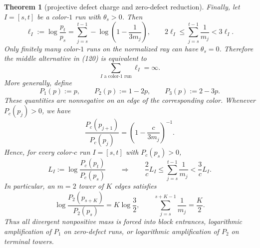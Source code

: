 \documentclass[11pt]{article}
\newtheorem{theorem}{Theorem}
\begin{document}
\begin{theorem}[projective defect charge and zero-defect reduction]
Finally, let $I=[s,t]$ be a color-$1$ run with $\theta_s>0$.  Then
\[
\boxed{
  \ell_I:=\log\frac{p_t}{p_s}
  =\sum_{j=s}^{t-1}-\log\left(1-\frac1{3m_j}\right),
  \qquad
  2\ell_I\leq\sum_{j=s}^{t-1}\frac1{m_j}<3\ell_I.}
\tag{121}
\]
Only finitely many color-$1$ runs on the normalized ray can have
$\theta_s=0$.  Therefore the middle alternative in (120) is equivalent to
\[
  \sum_{I\text{ a color-}1\text{ run}}\ell_I=\infty.
\tag{122}
\]
More generally, define
\[
  P_1(p):=p,
  \qquad
  P_2(p):=1-2p,
  \qquad
  P_3(p):=2-3p.
\tag{123}
\]
These quantities are nonnegative on an edge of the corresponding color.
Whenever $P_c(p_j)>0$, we have
\[
\boxed{
  \frac{P_c(p_{j+1})}{P_c(p_j)}
  =\left(1-\frac{c}{3m_j}\right)^{-1}.}
\tag{124}
\]
Hence, for every color-$c$ run $I=[s,t]$ with $P_c(p_s)>0$,
\[
  L_I:=\log\frac{P_c(p_t)}{P_c(p_s)}
  \qquad\Longrightarrow\qquad
  \frac2cL_I\leq\sum_{j=s}^{t-1}\frac1{m_j}<\frac3cL_I.
\tag{125}
\]
In particular, an $m=2$ tower of $K$ edges satisfies
\[
  \log\frac{P_2(p_{s+K})}{P_2(p_s)}=K\log\frac32,
  \qquad
  \sum_{j=s}^{s+K-1}\frac1{m_j}=\frac K2.
\tag{126}
\]
Thus all divergent nonpositive mass is forced into block entrances,
logarithmic amplification of $P_1$ on zero-defect runs, or logarithmic
amplification of $P_2$ on terminal towers.
\end{theorem}
\end{document}
